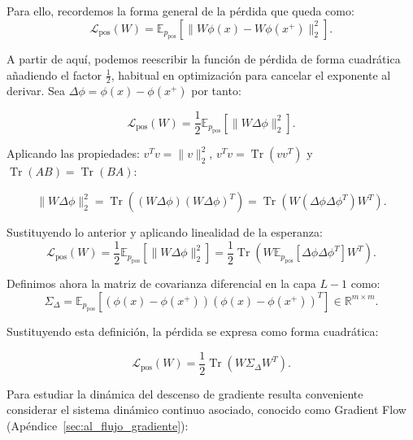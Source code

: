 Para ello, recordemos la forma general de la pérdida que queda como:
\begin{equation}
    \mathcal{L}_{\text{pos}}(W) = \mathbb{E}_{p_{\text{pos}}} \left[ \| W\phi(x) - W\phi(x^+) \|_2^2 \right].
\end{equation}

A partir de aquí, podemos reescribir la función de pérdida de forma cuadrática añadiendo el factor $\frac{1}{2}$, habitual en optimización para cancelar el exponente al derivar. Sea $\Delta \phi = \phi(x) - \phi(x^+)$ por tanto:

\begin{equation}
    \mathcal{L}_{\text{pos}}(W) = \frac{1}{2}\mathbb{E}_{p_{\text{pos}}} \left[\|W \Delta \phi\|_2^2 \right].
\end{equation}

Aplicando las propiedades: $v^T v = \|v\|_2^2 $, $v^T v = \operatorname{Tr}(v v^T)$ y $\operatorname{Tr}(AB) = \operatorname{Tr}(BA)$:

\begin{equation}
    \|W \Delta \phi\|_2^2 = \operatorname{Tr}\left( (W \Delta \phi) (W \Delta \phi)^T \right) = \operatorname{Tr}\left( W (\Delta \phi \Delta \phi^T) W^T \right).
\end{equation}

Sustituyendo lo anterior y aplicando linealidad de la esperanza:
\begin{equation}
    \mathcal{L}_{\text{pos}}(W) = \frac{1}{2} \mathbb{E}_{p_{\text{pos}}}\left[ \| W \Delta \phi \|_2^2 \right] = \frac{1}{2} \operatorname{Tr}\left( W \mathbb{E}_{p_{\text{pos}}}\left[ \Delta \phi \Delta \phi^T \right] W^T \right).
\end{equation}

Definimos ahora la matriz de covarianza diferencial en la capa $L-1$ como:
\begin{equation}
    \Sigma_{\Delta} = \mathbb{E}_{p_{\text{pos}}}\left[(\phi(x) - \phi(x^+))(\phi(x) - \phi(x^+))^T\right] \in \mathbb{R}^{m \times m}.
\end{equation}

Sustituyendo esta definición, la pérdida se expresa como forma cuadrática: 

\begin{equation}
    \mathcal{L}_{\text{pos}}(W) = \frac{1}{2} \operatorname{Tr}\left( W \Sigma_{\Delta} W^T \right).
\end{equation}
\vspace{10pt}

Para estudiar la dinámica del descenso de gradiente resulta conveniente considerar el sistema dinámico continuo asociado, conocido como Gradient Flow (Apéndice~\ref{sec:al_flujo_gradiente}):

